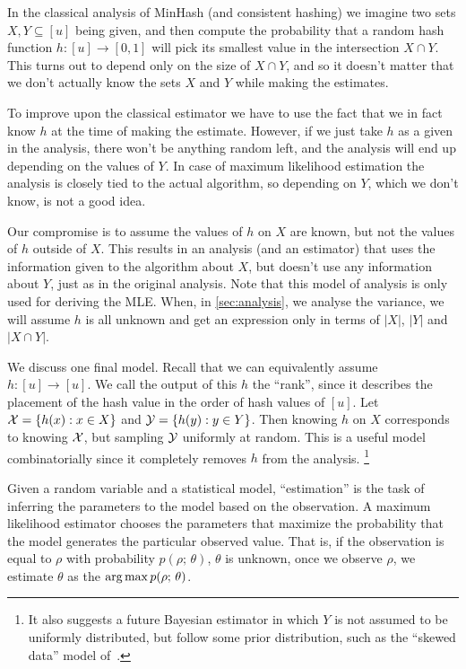 In the classical analysis of MinHash (and consistent hashing)
we imagine two sets $X,Y\subseteq[u]$ being given,
and then compute the probability that a random hash function $h:[u]\to[0,1]$ will pick its smallest value in the intersection $X\cap Y$.
This turns out to depend only on the size of $X\cap Y$, and so it doesn't matter that we don't actually know the sets $X$ and $Y$ while making the estimates.

To improve upon the classical estimator we have to use the fact that we in fact know $h$ at the time of making the estimate.
However, if we just take $h$ as a given in the analysis, there won't be anything random left, and the analysis will end up depending on the values of $Y$.
In case of maximum likelihood estimation the analysis is closely tied to the actual algorithm, so depending on $Y$, which we don't know, is not a good idea.

Our compromise is to assume the values of $h$ on $X$ are known, but not the values of $h$ outside of $X$.
This results in an analysis (and an estimator) that uses the information given to the algorithm about $X$, but doesn't use any information about $Y$, just as in the original analysis.
Note that this model of analysis is only used for deriving the MLE.
When, in \cref{sec:analysis}, we analyse the variance, we will assume $h$ is all unknown and get an expression only in terms of $|X|$, $|Y|$ and $|X\cap Y|$.

We discuss one final model.
Recall that we can equivalently assume $h:[u]\to[u]$.
We call the output of this $h$ the ``rank'', since it describes the placement of the hash value in the order of hash values of $[u]$.
Let $\mathcal{X}=\{h(x) : x\in X\}$ and $\mathcal{Y}=\{h(y):y\in Y\}$.
Then knowing $h$ on $X$ corresponds to knowing $\mathcal{X}$, but sampling $\mathcal{Y}$ uniformly at random.
This is a useful model combinatorially since it completely removes $h$ from the analysis.
\footnote{
   It also suggests a future Bayesian estimator in which $Y$ is not assumed to be uniformly distributed, but follow some prior distribution, such as the ``skewed data'' model of~\cite{mccauley2018set}.
}

\smallskip

Given a random variable and a statistical model, ``estimation'' is the task of inferring the parameters to the model based on the observation.
A maximum likelihood estimator chooses the parameters that maximize the probability that the model generates the particular observed value.
That is, if the observation is equal to $\rho$ with probability $p(\rho;\,\theta)$, $\theta$ is unknown, once we observe $\rho$, we estimate $\theta$ as the $\operatorname*{arg\,max} p(\rho;\,\theta)$.

